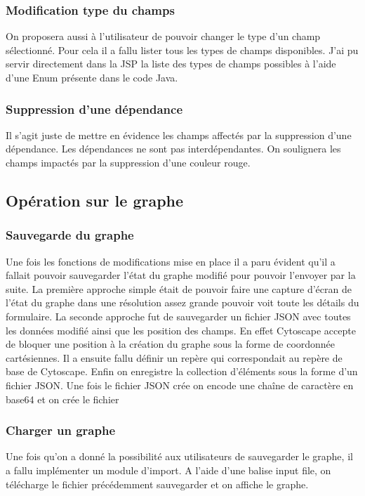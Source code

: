 \subsubsection{Modification type du champs}
On proposera aussi à l'utilisateur de pouvoir changer le type d'un champ sélectionné. Pour cela il a fallu lister tous les types de champs disponibles. J'ai pu servir directement dans la JSP la liste des types de champs possibles à l'aide d'une Enum présente dans le code Java.

\subsubsection{Suppression d’une dépendance}
Il s’agit juste de mettre en évidence les champs affectés par la suppression d’une dépendance. Les dépendances ne sont pas interdépendantes. On soulignera les champs impactés par la suppression d'une couleur rouge.
\clearpage
\subsection{Opération sur le graphe}
\subsubsection{Sauvegarde du graphe}
Une fois les fonctions de modifications mise en place il a paru évident qu’il a fallait pouvoir sauvegarder l’état du graphe modifié pour pouvoir l’envoyer par la suite.
La première approche simple était de pouvoir faire une capture d’écran de l’état du graphe dans une résolution assez grande pouvoir voit toute les détails du formulaire.
La seconde approche fut de sauvegarder un fichier JSON avec toutes les données modifié ainsi que les position des champs. En effet Cytoscape accepte de bloquer une position à la création du graphe sous la forme de coordonnée cartésiennes. Il a ensuite fallu définir un repère qui correspondait au repère de base de Cytoscape. Enfin on enregistre la collection d'éléments sous la forme d'un fichier JSON. Une fois le fichier JSON crée on encode une chaîne de caractère en base64 et on crée le fichier 

\subsubsection{Charger un graphe}
Une fois qu'on a donné la possibilité aux utilisateurs de sauvegarder le graphe, il a fallu implémenter un module d’import. A l'aide d'une balise input file, on télécharge le fichier précédemment sauvegarder et on affiche le graphe.

